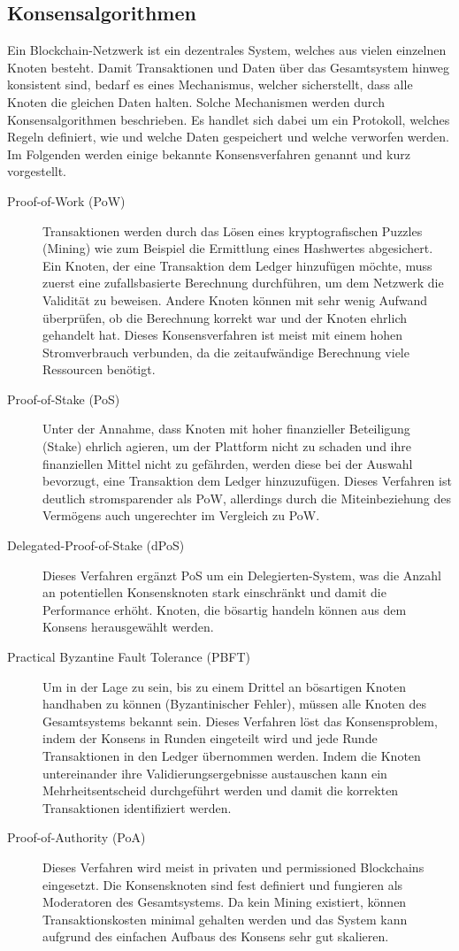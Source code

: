 \subsection{Konsensalgorithmen}
\label{subsec:fundamentals:dlt:consensus}
Ein Blockchain-Netzwerk ist ein dezentrales System, welches aus vielen einzelnen Knoten besteht. Damit Transaktionen und Daten über das Gesamtsystem hinweg konsistent sind, bedarf es eines Mechanismus, welcher sicherstellt, dass alle Knoten die gleichen Daten halten. Solche Mechanismen werden durch Konsensalgorithmen beschrieben. Es handlet sich dabei um ein Protokoll, welches Regeln definiert, wie und welche Daten gespeichert und welche verworfen werden. Im Folgenden werden einige bekannte Konsensverfahren genannt und kurz vorgestellt.
\begin{description}
  \item[Proof-of-Work (PoW)] Transaktionen werden durch das Lösen eines kryptografischen Puzzles (Mining) wie zum Beispiel die Ermittlung eines Hashwertes abgesichert. Ein Knoten, der eine Transaktion dem Ledger hinzufügen möchte, muss zuerst eine zufallsbasierte Berechnung durchführen, um dem Netzwerk die Validität zu beweisen. Andere Knoten können mit sehr wenig Aufwand überprüfen, ob die Berechnung korrekt war und der Knoten ehrlich gehandelt hat. Dieses Konsensverfahren ist meist mit einem hohen Stromverbrauch verbunden, da die zeitaufwändige Berechnung viele Ressourcen benötigt.
  \item[Proof-of-Stake (PoS)] Unter der Annahme, dass Knoten mit hoher finanzieller Beteiligung (Stake) ehrlich agieren, um der Plattform nicht zu schaden und ihre finanziellen Mittel nicht zu gefährden, werden diese bei der Auswahl bevorzugt, eine Transaktion dem Ledger hinzuzufügen. Dieses Verfahren ist deutlich stromsparender als PoW, allerdings durch die Miteinbeziehung des Vermögens auch ungerechter im Vergleich zu PoW.
  \item[Delegated-Proof-of-Stake (dPoS)] Dieses Verfahren ergänzt PoS um ein Delegierten-System, was die Anzahl an potentiellen Konsensknoten stark einschränkt und damit die Performance erhöht. Knoten, die bösartig handeln können aus dem Konsens herausgewählt werden.
  \item[Practical Byzantine Fault Tolerance (PBFT)] Um in der Lage zu sein, bis zu einem Drittel an bösartigen Knoten handhaben zu können (Byzantinischer Fehler), müssen alle Knoten des Gesamtsystems bekannt sein. Dieses Verfahren löst das Konsensproblem, indem der Konsens in Runden eingeteilt wird und jede Runde Transaktionen in den Ledger übernommen werden. Indem die Knoten untereinander ihre Validierungsergebnisse austauschen kann ein Mehrheitsentscheid durchgeführt werden und damit die korrekten Transaktionen identifiziert werden.
  \item[Proof-of-Authority (PoA)] Dieses Verfahren wird meist in privaten und permissioned Blockchains eingesetzt. Die Konsensknoten sind fest definiert und fungieren als Moderatoren des Gesamtsystems. Da kein Mining existiert, können Transaktionskosten minimal gehalten werden und das System kann aufgrund des einfachen Aufbaus des Konsens sehr gut skalieren.
\end{description}
